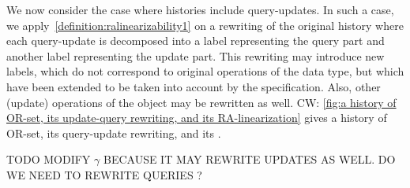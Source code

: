 We now consider the case where histories include query-updates.
In such a case, we apply~\autoref{definition:ralinearizability1} on a
rewriting of the original history where each query-update is
decomposed into a label representing the query part and another label
representing the update part.
{This rewriting may introduce new labels, which do not correspond to
original operations of the data type, but which have been extended to
be taken into account by the specification.
Also, other (update) operations of the object may be rewritten as
well.}
 {\color {red}CW: \autoref{fig:a history of OR-set, its update-query rewriting, and its RA-linearization} gives a history of OR-set, its query-update rewriting, and its \crdtlinearization{}.}

TODO MODIFY $\gamma$ BECAUSE IT MAY REWRITE UPDATES AS WELL. DO WE NEED TO REWRITE QUERIES ?

